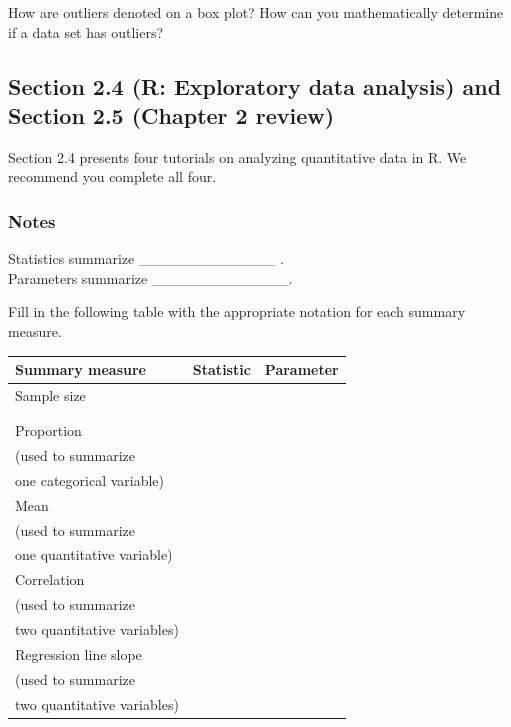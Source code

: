 \documentclass[
]{report}
\newcommand{\rgs}{\vspace{12pt}} %
\begin{document}
How are outliers denoted on a box plot? How can you mathematically determine if a data set has outliers?
\rgs

\hypertarget{section-2.4-r-exploratory-data-analysis-and-section-2.5-chapter-2-review}{%
\subsection*{Section 2.4 (R: Exploratory data analysis) and Section 2.5 (Chapter 2 review)}\label{section-2.4-r-exploratory-data-analysis-and-section-2.5-chapter-2-review}}

Section 2.4 presents four tutorials on analyzing quantitative data in R. We recommend you complete all four.

\hypertarget{notes-6}{%
\subsubsection*{Notes}\label{notes-6}}

Statistics summarize \_\_\_\_\_\_\_\_\_\_\_\_\_ .\\
Parameters summarize \_\_\_\_\_\_\_\_\_\_\_\_\_.

Fill in the following table with the appropriate notation for each summary measure.

\begin{center}
\begin{tabular}{|l|p{2in}|p{2in}|}\hline
Summary measure & Statistic & Parameter \\ \hline
Sample size & & \\ 
& & \\ 
& & \\ \hline
Proportion & & \\ 
(used to summarize & & \\ 
one categorical variable) & & \\ \hline
Mean & & \\ 
(used to summarize & & \\ 
one quantitative variable)& & \\ \hline
Correlation & & \\ 
(used to summarize & & \\ 
two quantitative variables)& & \\ \hline
Regression line slope & & \\ 
(used to summarize & & \\ 
two quantitative variables)& & \\ \hline
\end{tabular}
\end{center}
\end{document}
